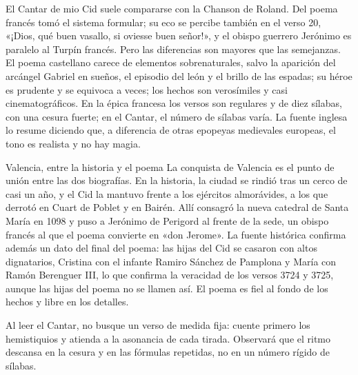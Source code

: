 \documentclass{book}
\begin{document}
El Cantar de mio Cid suele compararse con la Chanson de Roland. Del poema francés tomó el sistema formular; su eco se percibe también en el verso 20, «¡Dios, qué buen vasallo, si oviesse buen señor!», y el obispo guerrero Jerónimo es paralelo al Turpín francés. Pero las diferencias son mayores que las semejanzas. El poema castellano carece de elementos sobrenaturales, salvo la aparición del arcángel Gabriel en sueños, el episodio del león y el brillo de las espadas; su héroe es prudente y se equivoca a veces; los hechos son verosímiles y casi cinematográficos. En la épica francesa los versos son regulares y de diez sílabas, con una cesura fuerte; en el Cantar, el número de sílabas varía. La fuente inglesa lo resume diciendo que, a diferencia de otras epopeyas medievales europeas, el tono es realista y no hay magia.


\begin{tcolorbox}[title={Consejo}, studiumtip, breakable]

Valencia, entre la historia y el poema
La conquista de Valencia es el punto de unión entre las dos biografías. En la historia, la ciudad se rindió tras un cerco de casi un año, y el Cid la mantuvo frente a los ejércitos almorávides, a los que derrotó en Cuart de Poblet y en Bairén. Allí consagró la nueva catedral de Santa María en 1098 y puso a Jerónimo de Perigord al frente de la sede, un obispo francés al que el poema convierte en «don Jerome». La fuente histórica confirma además un dato del final del poema: las hijas del Cid se casaron con altos dignatarios, Cristina con el infante Ramiro Sánchez de Pamplona y María con Ramón Berenguer III, lo que confirma la veracidad de los versos 3724 y 3725, aunque las hijas del poema no se llamen así. El poema es fiel al fondo de los hechos y libre en los detalles.


Al leer el Cantar, no busque un verso de medida fija: cuente primero los hemistiquios y atienda a la asonancia de cada tirada. Observará que el ritmo descansa en la cesura y en las fórmulas repetidas, no en un número rígido de sílabas.

\end{tcolorbox}
\end{document}
